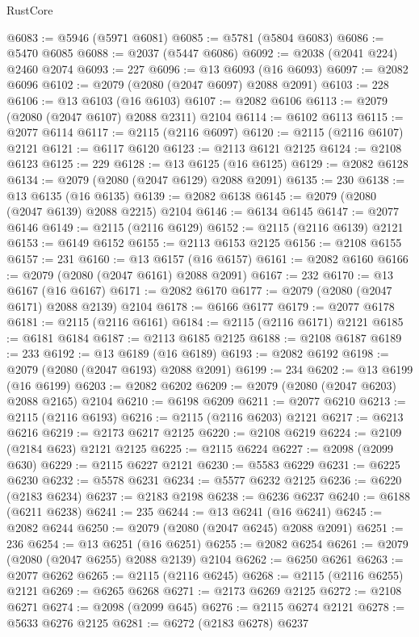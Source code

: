 \begin{lexlean}{RustCore}
\begin{coremodule}
@6083 := @5946 (@5971 @6081)
@6085 := @5781 (@5804 @6083)
@6086 := @5470 @6085
@6088 := @2037 (@5447 @6086)
@6092 := @2038 (@2041 @224) @2460 @2074
@6093 := 227
@6096 := @13 @6093 (@16 @6093)
@6097 := @2082 @6096
@6102 := @2079 (@2080 (@2047 @6097) @2088 @2091)
@6103 := 228
@6106 := @13 @6103 (@16 @6103)
@6107 := @2082 @6106
@6113 := @2079 (@2080 (@2047 @6107) @2088 @2311) @2104
@6114 := @6102 @6113
@6115 := @2077 @6114
@6117 := @2115 (@2116 @6097)
@6120 := @2115 (@2116 @6107) @2121
@6121 := @6117 @6120
@6123 := @2113 @6121 @2125
@6124 := @2108 @6123
@6125 := 229
@6128 := @13 @6125 (@16 @6125)
@6129 := @2082 @6128
@6134 := @2079 (@2080 (@2047 @6129) @2088 @2091)
@6135 := 230
@6138 := @13 @6135 (@16 @6135)
@6139 := @2082 @6138
@6145 := @2079 (@2080 (@2047 @6139) @2088 @2215) @2104
@6146 := @6134 @6145
@6147 := @2077 @6146
@6149 := @2115 (@2116 @6129)
@6152 := @2115 (@2116 @6139) @2121
@6153 := @6149 @6152
@6155 := @2113 @6153 @2125
@6156 := @2108 @6155
@6157 := 231
@6160 := @13 @6157 (@16 @6157)
@6161 := @2082 @6160
@6166 := @2079 (@2080 (@2047 @6161) @2088 @2091)
@6167 := 232
@6170 := @13 @6167 (@16 @6167)
@6171 := @2082 @6170
@6177 := @2079 (@2080 (@2047 @6171) @2088 @2139) @2104
@6178 := @6166 @6177
@6179 := @2077 @6178
@6181 := @2115 (@2116 @6161)
@6184 := @2115 (@2116 @6171) @2121
@6185 := @6181 @6184
@6187 := @2113 @6185 @2125
@6188 := @2108 @6187
@6189 := 233
@6192 := @13 @6189 (@16 @6189)
@6193 := @2082 @6192
@6198 := @2079 (@2080 (@2047 @6193) @2088 @2091)
@6199 := 234
@6202 := @13 @6199 (@16 @6199)
@6203 := @2082 @6202
@6209 := @2079 (@2080 (@2047 @6203) @2088 @2165) @2104
@6210 := @6198 @6209
@6211 := @2077 @6210
@6213 := @2115 (@2116 @6193)
@6216 := @2115 (@2116 @6203) @2121
@6217 := @6213 @6216
@6219 := @2173 @6217 @2125
@6220 := @2108 @6219
@6224 := @2109 (@2184 @623) @2121 @2125
@6225 := @2115 @6224
@6227 := @2098 (@2099 @630)
@6229 := @2115 @6227 @2121
@6230 := @5583 @6229
@6231 := @6225 @6230
@6232 := @5578 @6231
@6234 := @5577 @6232 @2125
@6236 := @6220 (@2183 @6234)
@6237 := @2183 @2198
@6238 := @6236 @6237
@6240 := @6188 (@6211 @6238)
@6241 := 235
@6244 := @13 @6241 (@16 @6241)
@6245 := @2082 @6244
@6250 := @2079 (@2080 (@2047 @6245) @2088 @2091)
@6251 := 236
@6254 := @13 @6251 (@16 @6251)
@6255 := @2082 @6254
@6261 := @2079 (@2080 (@2047 @6255) @2088 @2139) @2104
@6262 := @6250 @6261
@6263 := @2077 @6262
@6265 := @2115 (@2116 @6245)
@6268 := @2115 (@2116 @6255) @2121
@6269 := @6265 @6268
@6271 := @2173 @6269 @2125
@6272 := @2108 @6271
@6274 := @2098 (@2099 @645)
@6276 := @2115 @6274 @2121
@6278 := @5633 @6276 @2125
@6281 := @6272 (@2183 @6278) @6237

\end{coremodule}
\end{lexlean}
